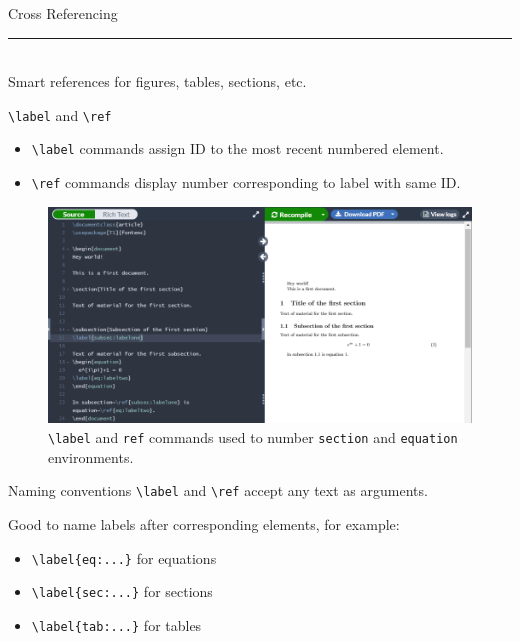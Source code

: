 \documentclass{beamer}
\begin{document}
{  \begin{frame}[plain]
    \vfill
    \centering
    \begin{beamercolorbox}[sep=8pt,center,shadow=true,rounded=true]{Cross Referencing}
      \insertsectionhead\par%
      \color{davisblue}\noindent\rule{10cm}{1pt} \\
      \footnotesize{Smart references for figures, tables, sections, etc.}
    \end{beamercolorbox}
    \vfill
  \end{frame}

  \begin{frame}{\texttt{\textbackslash label} and \texttt{\textbackslash ref}}
    \begin{itemize}
      \item \texttt{\textbackslash label} commands assign ID to the most recent numbered element.
      \item \texttt{\textbackslash ref} commands display number corresponding to label with same ID.
    \end{itemize}
    \begin{figure}
      \includegraphics[width=0.9\linewidth]{day02-00A-references.png}
      \caption{\texttt{\textbackslash label} and \texttt{ref} commands used to number \texttt{section} and \texttt{equation} environments.}
      \label{fig:day02-00A}
    \end{figure}
  \end{frame}

  \begin{frame}{Naming conventions}
    \texttt{\textbackslash label} and \texttt{\textbackslash ref} accept any text as arguments.

    Good to name labels after corresponding elements, for example:
    \begin{itemize}
      \item \texttt{\textbackslash label\{eq:...\}} for equations
      \item \texttt{\textbackslash label\{sec:...\}} for sections
      \item \texttt{\textbackslash label\{tab:...\}} for tables
    \end{itemize}
  \end{frame}

}
\end{document}
